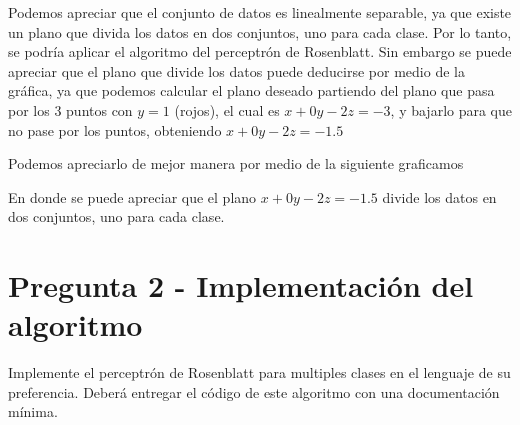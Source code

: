 \documentclass{article}
\theoremstyle{mytheoremstyle}
\theoremstyle{mytheoremstyle}
\theoremstyle{myproblemstyle}
\begin{document}
\begin{enumerate}[label=(\alph*)]
        Podemos apreciar que el conjunto de datos es linealmente separable, ya que  existe un plano que divida los datos en dos conjuntos, uno para cada clase. Por lo tanto, se podría aplicar el algoritmo del perceptrón de Rosenblatt. Sin embargo se puede apreciar que el plano que divide los datos puede deducirse por medio de la gráfica, ya que podemos calcular el plano deseado partiendo del plano que pasa por los 3 puntos con $y=1$ (rojos), el cual es $x+0y-2z=-3$, y bajarlo para que no pase por los puntos, obteniendo $x+0y-2z=-1.5$

        Podemos apreciarlo de mejor manera por medio de la siguiente graficamos

        \begin{center}

        \end{center}

        En donde se puede apreciar que el plano $x+0y-2z=-1.5$ divide los datos en dos conjuntos, uno para cada clase.

\end{enumerate}

\section{Pregunta 2 - Implementación del algoritmo}
Implemente el perceptrón de Rosenblatt para multiples clases en el lenguaje de su preferencia. Deberá entregar el código de este algoritmo con una documentación mínima.
\end{document}
